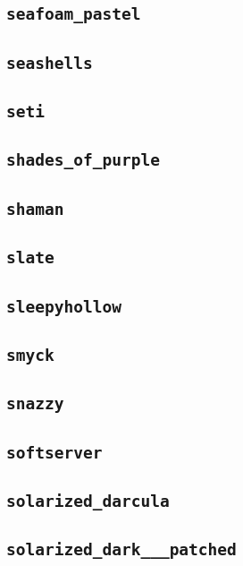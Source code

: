 \subsection{\texttt{seafoam\_pastel}}
\newpage
\subsection{\texttt{seashells}}
\newpage
\subsection{\texttt{seti}}
\newpage
\subsection{\texttt{shades\_of\_purple}}
\newpage
\subsection{\texttt{shaman}}
\newpage
\subsection{\texttt{slate}}
\newpage
\subsection{\texttt{sleepyhollow}}
\newpage
\subsection{\texttt{smyck}}
\newpage
\subsection{\texttt{snazzy}}
\newpage
\subsection{\texttt{softserver}}
\newpage
\subsection{\texttt{solarized\_darcula}}
\newpage
\subsection{\texttt{solarized\_dark\_\_\_patched}}
\newpage
